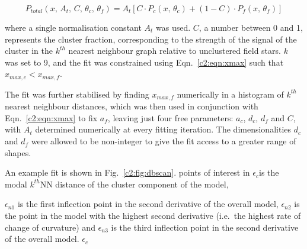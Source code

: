 \begin{equation}
P_{total}(x, \, A_t, \, C, \, \theta_c, \, \theta_f) = A_t \left[ C \cdot P_{c}(x, \, \theta_c) + (1-C) \cdot P_{f}(x, \, \theta_f) \right]
\end{equation}

\noindent
where a single normalisation constant $A_t$ was used. $C$, a number between 0 and 1, represents the cluster fraction, corresponding to the strength of the signal of the cluster in the $k^{th}$ nearest neighbour graph relative to unclustered field stars. $k$ was set to 9, and the fit was constrained using Eqn.~\ref{c2:eqn:xmax} such that $x_{max, c} < x_{max, f}$.

The fit was further stabilised by finding $x_{max, f}$ numerically in a histogram of $k^{th}$ nearest neighbour distances, which was then used in conjunction with Eqn.~\ref{c2:eqn:xmax} to fix $a_f$, leaving just four free parameters: $a_c$, $d_c$, $d_f$ and $C$, with $A_t$ determined numerically at every fitting iteration. The dimensionalities $d_c$ and $d_f$ were allowed to be non-integer to give the fit access to a greater range of shapes.

An example fit is shown in Fig.~\ref{c2:fig:dbscan}. points of interest in $\epsilon_c$\review{, }is the modal $k^{th}$NN distance of the cluster component of the model, 

$\epsilon_{n1}$ is the first inflection point in the second derivative of the overall model, $\epsilon_{n2}$ is the point in the model with the highest second derivative (i.e.\ the highest rate of change of curvature) and $\epsilon_{n3}$ is the third inflection point in the second derivative of the overall model. $\epsilon_c$ 

